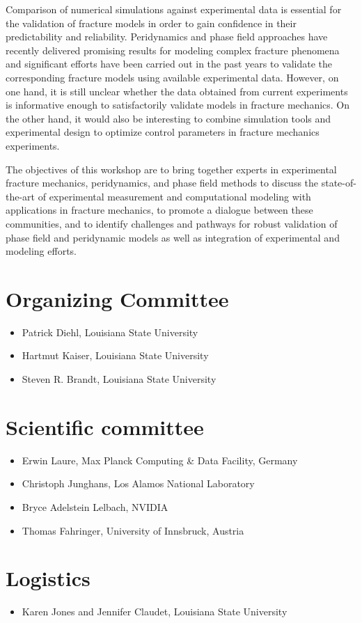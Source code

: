 Comparison of numerical simulations against experimental data is essential
for the validation of fracture models in order to gain confidence in their
predictability and reliability. Peridynamics and phase field approaches have recently
delivered promising results for modeling complex fracture phenomena and significant
efforts have been carried out in the past years to validate the corresponding
fracture models using available experimental data. However, on one hand, it is still
unclear whether the data obtained from current experiments is informative enough to
satisfactorily validate models in fracture mechanics. On the other hand, it would also be
interesting to combine simulation tools and experimental design to optimize
control parameters in fracture mechanics experiments.

The objectives of this workshop are to bring together experts in experimental fracture mechanics,
peridynamics, and phase field methods to discuss the state-of-the-art of experimental
measurement and computational modeling with applications in fracture mechanics, to promote
a dialogue between these communities, and to identify challenges and pathways for robust validation
of phase field and peridynamic models as well as integration of experimental and modeling efforts.

\section*{Organizing Committee}
\begin{itemize}
\item Patrick Diehl, Louisiana State University
\item Hartmut Kaiser, Louisiana State University
\item Steven R. Brandt, Louisiana State University
\end{itemize}

\section*{Scientific committee}
\begin{itemize}
\item Erwin Laure, Max Planck Computing \& Data Facility, Germany
\item Christoph Junghans, Los Alamos National Laboratory
\item Bryce Adelstein Lelbach, NVIDIA
\item Thomas Fahringer, University of Innsbruck, Austria
\end{itemize}

\section*{Logistics}
\begin{itemize}
\item Karen Jones and Jennifer Claudet, Louisiana State University
\end{itemize}
